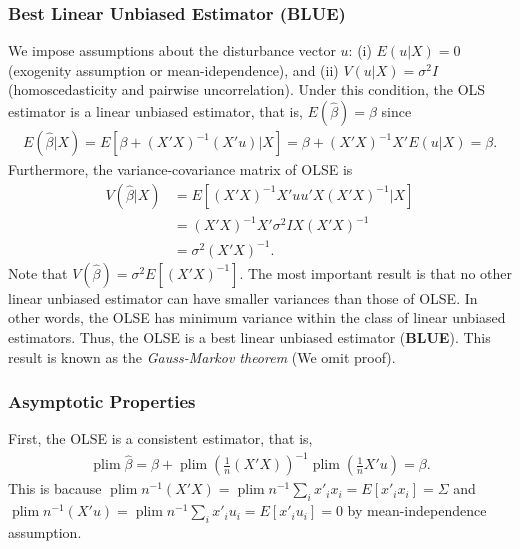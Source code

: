 \documentclass[
  12pt,
]{article}
\begin{document}
\hypertarget{best-linear-unbiased-estimator-blue}{%
\subsubsection{Best Linear Unbiased Estimator
(BLUE)}\label{best-linear-unbiased-estimator-blue}}

We impose assumptions about the disturbance vector \(u\): (i)
\(E(u|X) = 0\) (exogenity assumption or mean-idependence), and (ii)
\(V(u|X) = \sigma^2 I\) (homoscedasticity and pairwise uncorrelation).
Under this condition, the OLS estimator is a linear unbiased estimator,
that is, \(E(\hat{\beta}) = \beta\) since \begin{align*}
  E(\hat{\beta}|X) = E[\beta + (X'X)^{-1}(X'u)|X] = \beta + (X'X)^{-1}X'E(u|X) = \beta.
\end{align*} Furthermore, the variance-covariance matrix of OLSE is
\begin{align*}
  V(\hat{\beta}|X) 
  &= E[(X'X)^{-1}X' uu' X (X'X)^{-1} | X] \\
  &= (X'X)^{-1}X' \sigma^2 I X (X'X)^{-1} \\
  &= \sigma^2 (X'X)^{-1}.
\end{align*} Note that \(V(\hat{\beta}) = \sigma^2 E[ (X'X)^{-1} ]\).
The most important result is that no other linear unbiased estimator can
have smaller variances than those of OLSE. In other words, the OLSE has
minimum variance within the class of linear unbiased estimators. Thus,
the OLSE is a best linear unbiased estimator (\textbf{BLUE}). This
result is known as the \emph{Gauss-Markov theorem} (We omit proof).

\hypertarget{asymptotic-properties}{%
\subsubsection{Asymptotic Properties}\label{asymptotic-properties}}

First, the OLSE is a consistent estimator, that is, \begin{align*}
  \mathop{\mathrm{plim}}\hat{\beta} = \beta + \mathop{\mathrm{plim}}\left( \frac{1}{n} (X'X) \right)^{-1} \mathop{\mathrm{plim}}\left( \frac{1}{n} X'u \right) = \beta.
\end{align*} This is bacause
\(\mathop{\mathrm{plim}}n^{-1} (X'X) = \mathop{\mathrm{plim}}n^{-1} \sum_i x'_i x_i = E[x'_i x_i] = \Sigma\)
and
\(\mathop{\mathrm{plim}}n^{-1} (X'u) = \mathop{\mathrm{plim}}n^{-1} \sum_i x'_i u_i = E[x'_i u_i] = 0\)
by mean-independence assumption.
\end{document}
